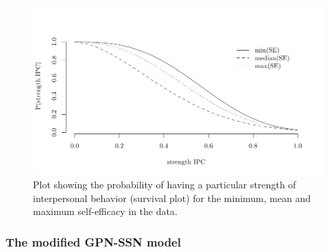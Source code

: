 \documentclass[12pt,]{article}
\begin{document}
\begin{figure}
\centering
\includegraphics[width = \textwidth]{Plots/survivaldiffSE.pdf}
\caption{Plot showing the probability of having a particular strength of interpersonal behavior (survival plot) for the minimum, mean and maximum self-efficacy in the data.}
\label{reglineweib}
\end{figure}

\subsubsection{The modified GPN-SSN model} \label{resGPNSSN}
\end{document}
